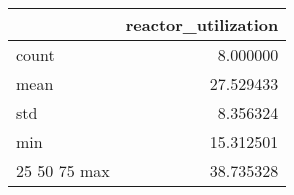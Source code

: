 \begin{tabular}{lr}
\toprule
 & reactor\_utilization \\
\midrule
count & 8.000000 \\
mean & 27.529433 \\
std & 8.356324 \\
min & 15.312501 \\
25%
50%
75%
max & 38.735328 \\
\bottomrule
\end{tabular}

